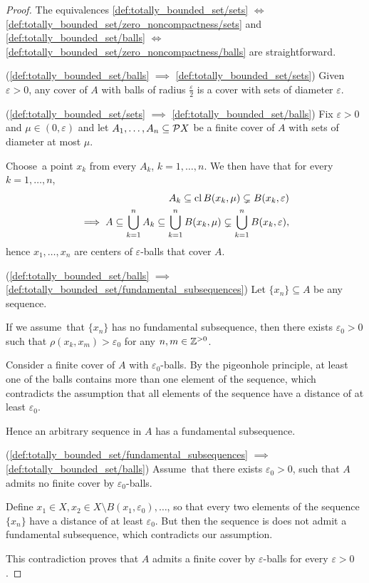 \begin{proof}
  The equivalences \ref{def:totally_bounded_set/sets} $\iff$ \ref{def:totally_bounded_set/zero_noncompactness/sets} and \ref{def:totally_bounded_set/balls} $\iff$ \ref{def:totally_bounded_set/zero_noncompactness/balls} are straightforward.

  (\ref{def:totally_bounded_set/balls} $\implies$ \ref{def:totally_bounded_set/sets}) Given $\varepsilon > 0$, any cover of $A$ with balls of radius $\frac \varepsilon 2$ is a cover with sets of diameter $\varepsilon$.

  (\ref{def:totally_bounded_set/sets} $\implies$ \ref{def:totally_bounded_set/balls}) Fix $\varepsilon > 0$ and $\mu \in (0, \varepsilon)$ and let $A_1, \ldots, A_n \subseteq \mathcal{P} X$ be a finite cover of $A$ with sets of diameter at most $\mu$.

  Choose\AOC~a point $x_k$ from every $A_k$, $k = 1, \ldots, n$. We then have that for every $k = 1, \ldots, n$,
  \begin{align*}
    A_k \subseteq \operatorname{cl} B(x_k, \mu) \subsetneq B(x_k, \varepsilon)
    \\
    \implies A \subseteq \bigcup_{k=1}^n A_k \subseteq \bigcup_{k=1}^n B(x_k, \mu) \subsetneq \bigcup_{k=1}^n B(x_k, \varepsilon),
  \end{align*}
  hence $x_1, \ldots, x_n$ are centers of $\varepsilon$-balls that cover $A$.

  (\ref{def:totally_bounded_set/balls} $\implies$ \ref{def:totally_bounded_set/fundamental_subsequences}) Let $\{ x_n \} \subseteq A$ be any sequence.

  If we assume\LEM\ that $\{ x_n \}$ has no fundamental subsequence, then there exists $\varepsilon_0 > 0$ such that $\rho(x_k, x_m) > \varepsilon_0$ for any $n, m \in \mathbb{Z}^{>0}$.

  Consider a finite cover of $A$ with $\varepsilon_0$-balls. By the pigeonhole principle, at least one of the balls contains more than one element of the sequence, which contradicts the assumption that all elements of the sequence have a distance of at least $\varepsilon_0$.

  Hence an arbitrary sequence in $A$ has a fundamental subsequence.

  (\ref{def:totally_bounded_set/fundamental_subsequences} $\implies$ \ref{def:totally_bounded_set/balls}) Assume\LEM\ that there exists $\varepsilon_0 > 0$, such that $A$ admits no finite cover by $\varepsilon_0$-balls.

  Define $x_1 \in X, x_2 \in X \setminus B(x_1, \varepsilon_0), \ldots$, so that every two elements of the sequence $\{ x_n \}$ have a distance of at least $\varepsilon_0$. But then the sequence is does not admit a fundamental subsequence, which contradicts our assumption.

  This contradiction proves that $A$ admits a finite cover by $\varepsilon$-balls for every $\varepsilon > 0$.
\end{proof}

